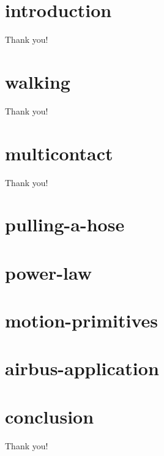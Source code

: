 \documentclass{beamer}
\begin{document}
\begin{frame}{}
  \titlepage
\end{frame}

\section{introduction}
\setcounter{subsection}{1}

\begin{frame}{Thank you!}
\end{frame}

\section{walking}
\setcounter{subsection}{2}

\begin{frame}{Thank you!}
\end{frame}

\section{multicontact}
\setcounter{subsection}{3}

\begin{frame}{Thank you!}
\end{frame}

\section{pulling-a-hose}
\setcounter{subsection}{4}

\section{power-law}
\setcounter{subsection}{5}

\section{motion-primitives}
\setcounter{subsection}{6}

\section{airbus-application}
\setcounter{subsection}{7}

\section{conclusion}
\setcounter{subsection}{8}

\begin{frame}{Thank you!}
\end{frame}
\end{document}
